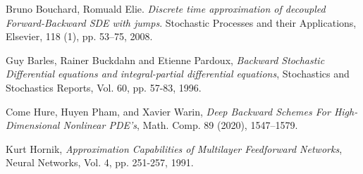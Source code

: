 \begin{thebibliography}{99}



Bruno Bouchard, Romuald Elie. \emph{Discrete time approximation of decoupled Forward-Backward SDE with jumps}. Stochastic Processes and their Applications, Elsevier, 118 (1), pp. 53--75, 2008.

Guy Barles, Rainer Buckdahn and Etienne Pardoux, \emph{Backward Stochastic Differential equations and integral-partial differential equations}, Stochastics and Stochastics Reports, Vol. 60, pp. 57-83, 1996.

Come Hure, Huyen Pham, and Xavier Warin, \emph{Deep Backward Schemes
For High-Dimensional Nonlinear PDE's}, Math. Comp. 89 (2020), 1547--1579.

Kurt Hornik, \textit{Approximation Capabilities of Multilayer Feedforward Networks}, Neural Networks, Vol. 4, pp. 251-257, 1991.



















 

















\end{thebibliography}

